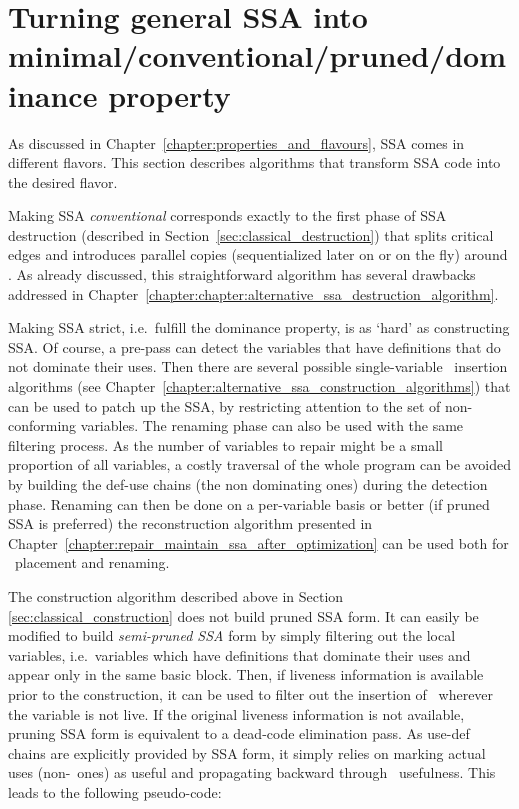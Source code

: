 \section{Turning general SSA into minimal/conventional/pruned/dominance property}

As discussed in Chapter~\ref{chapter:properties_and_flavours},
SSA comes in different flavors. 
This section describes  algorithms that transform SSA
code
into the desired flavor.

Making SSA \textit{conventional} corresponds exactly to the first phase of SSA destruction (described in Section~\ref{sec:classical_destruction}) that splits critical edges and introduces parallel copies (sequentialized later on or on the fly) around \phiops. As already discussed, this straightforward algorithm has several drawbacks addressed in Chapter~\ref{chapter:chapter:alternative_ssa_destruction_algorithm}.

Making SSA strict, i.e.\ fulfill the dominance property, is as `hard' as constructing SSA. Of course, a pre-pass can detect the variables that have definitions that do not dominate their uses. Then there are several possible single-variable \phiops\ insertion algorithms (see Chapter~\ref{chapter:alternative_ssa_construction_algorithms}) that can be used to patch up the SSA, by restricting attention to the set of non-conforming variables. The renaming phase can also be used with the same filtering process. As the number of variables to repair might be a small proportion of all variables, a costly traversal of the whole program can be avoided by building the def-use chains (the non dominating ones) during the detection phase. Renaming can then be done on a per-variable basis or better (if pruned SSA is preferred) the reconstruction algorithm presented in Chapter~\ref{chapter:repair_maintain_ssa_after_optimization} can be used both for \phiops\ placement and renaming.

The construction algorithm described above in
Section \ref{sec:classical_construction} does not
build pruned SSA form. It can easily be modified to 
build \textit{semi-pruned SSA} form by simply filtering out the local variables, i.e.\ variables which have definitions that dominate their uses and appear only in the same basic block. Then, if liveness information is available prior to the construction, it can be used to filter out the insertion of \phiops\ wherever the variable is not live.
If the original liveness information is not available, pruning SSA form is equivalent to a dead-code elimination pass. As use-def chains are explicitly provided by SSA form, it simply relies on marking actual uses (non-\phiops\ ones) as useful and propagating backward through \phiops\ usefulness. This leads to the following pseudo-code:


